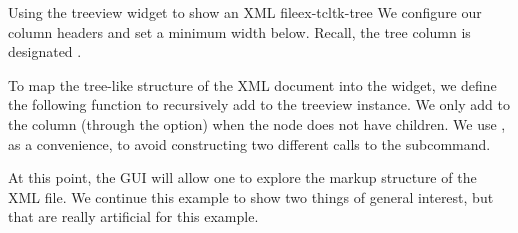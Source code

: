 \begin{example}{Using the treeview widget to show an XML file}{ex-tcltk-tree}
We configure our column headers and set a minimum
width below. Recall, the tree column is designated .
\begin{Schunk}
\end{Schunk}

To map the tree-like structure of the XML document into the widget, we
define the following function to recursively add to the treeview
instance.  We only add to the  column (through the
 option) when the node does not have children. We use
, as a convenience, to avoid constructing two different
calls to the  subcommand. 
\begin{Schunk}
\end{Schunk}
%
At this point, the GUI will allow one to explore the markup structure of the
XML file. We continue this example to show two things of general
interest, but that are really artificial for this example.



\end{example}
